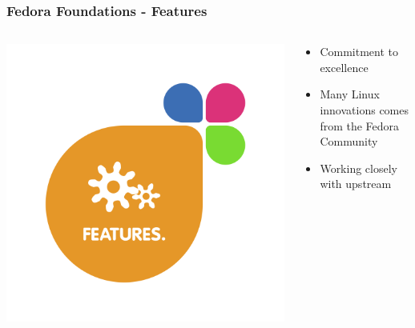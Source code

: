 \documentclass[t,aspectratio=169]{beamer}
\begin{document}
\begin{frame}
    \frametitle{Fedora Foundations - Features}
    \begin{columns}[T] %
        \begin{column}{.5\textwidth}
            \includegraphics[width=\linewidth]{foundations_expand_3_features.png}
        \end{column}
        \begin{column}{.5\textwidth}
            \begin{itemize}
                \item<2-> Commitment to excellence
                \item<3-> Many Linux innovations comes from the Fedora Community
                \item<4-> Working closely with upstream
            \end{itemize}
        \end{column}
    \end{columns}
\end{frame}
\end{document}
